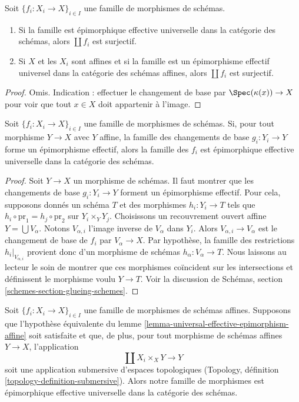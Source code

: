 \begin{lemma}
\label{lemma-universal-effective-epimorphism-surjective}
Soit $\{f_i : X_i \to X\}_{i \in I}$ une famille de morphismes de schémas.
\begin{enumerate}
\item Si la famille est épimorphique effective universelle dans la catégorie
des schémas, alors $\coprod f_i$ est surjectif.
\item Si $X$ et les $X_i$ sont affines et si la famille est un épimorphisme
effectif universel dans la catégorie des schémas affines, alors
$\coprod f_i$ est surjectif.
\end{enumerate}
\end{lemma}

\begin{proof}
Omis. Indication : effectuer le changement de base par
$\Spec(\kappa(x)) \to X$ pour voir que tout $x \in X$ doit appartenir à
l'image.
\end{proof}

\begin{lemma}
\label{lemma-check-universal-effective-epimorphism-affine}
Soit $\{f_i : X_i \to X\}_{i \in I}$ une famille de morphismes de schémas.
Si, pour tout morphisme $Y \to X$ avec $Y$ affine, la famille des changements
de base $g_i : Y_i \to Y$ forme un épimorphisme effectif, alors la famille des
$f_i$ est épimorphique effective universelle dans la catégorie des schémas.
\end{lemma}

\begin{proof}
Soit $Y \to X$ un morphisme de schémas. Il faut montrer que les changements
de base $g_i : Y_i \to Y$ forment un épimorphisme effectif.
Pour cela, supposons donnés un schéma $T$ et des morphismes $h_i : Y_i \to T$
tels que $h_i \circ \text{pr}_1 = h_j \circ \text{pr}_2$ sur
$Y_i \times_Y Y_j$.
Choisissons un recouvrement ouvert affine $Y = \bigcup V_\alpha$.
Notons $V_{\alpha, i}$ l'image inverse de $V_\alpha$ dans $Y_i$.
Alors $V_{\alpha, i}  \to V_\alpha$ est le changement de base de $f_i$ par
$V_\alpha \to X$. Par hypothèse, la famille des restrictions
$h_i|_{V_{\alpha, i}}$ provient donc d'un morphisme de schémas
$h_\alpha : V_\alpha \to T$.
Nous laissons au lecteur le soin de montrer que ces morphismes coïncident sur
les intersections et définissent le morphisme voulu $Y \to T$.
Voir la discussion de Schémas, section
\ref{schemes-section-glueing-schemes}.
\end{proof}

\begin{lemma}
\label{lemma-universal-effective-epimorphism}
Soit $\{f_i : X_i \to X\}_{i \in I}$ une famille de morphismes de schémas
affines. Supposons que l'hypothèse équivalente du lemme
\ref{lemma-universal-effective-epimorphism-affine} soit satisfaite et que,
de plus, pour tout morphisme de schémas affines $Y \to X$, l'application
$$
\coprod X_i \times_X Y \longrightarrow Y
$$
soit une application submersive d'espaces topologiques
(Topology, définition \ref{topology-definition-submersive}).
Alors notre famille de morphismes est épimorphique effective universelle dans
la catégorie des schémas.
\end{lemma}

